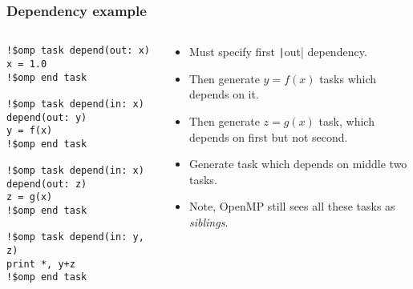 \documentclass{beamer}
\begin{document}
\begin{frame}[fragile]
\frametitle{Dependency example}
\begin{columns}
\begin{column}{0.5\textwidth}
\begin{verbatim}
!$omp task depend(out: x)
x = 1.0
!$omp end task

!$omp task depend(in: x) depend(out: y)
y = f(x)
!$omp end task

!$omp task depend(in: x) depend(out: z)
z = g(x)
!$omp end task

!$omp task depend(in: y, z)
print *, y+z
!$omp end task
\end{verbatim}
\end{column}

\begin{column}{0.5\textwidth}
\begin{itemize}
  \item Must specify first \texttt|out| dependency.
  \item Then generate $y=f(x)$ tasks which depends on it.
  \item Then generate $z=g(x)$ task, which depends on first but not second.
  \item Generate task which depends on middle two tasks.
  \item Note, OpenMP still sees all these tasks as \emph{siblings}.
\end{itemize}
\end{column}
\end{columns}

\end{frame}
\end{document}
